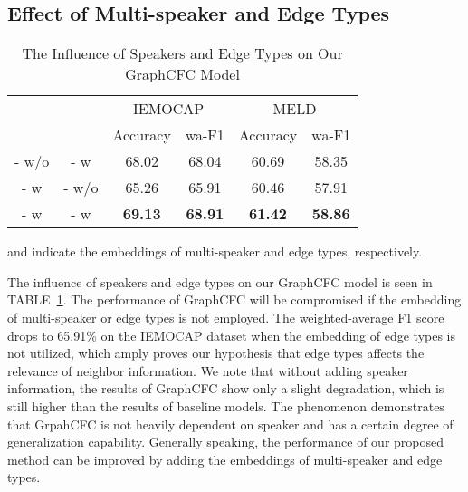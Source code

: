 \documentclass[lettersize,journal]{IEEEtran}
\begin{document}
\subsection{Effect of Multi-speaker and Edge Types}
\begin{table}[htbp]
\centering
\renewcommand{\arraystretch}{1.0}
\setlength{\tabcolsep}{7pt}
\caption{The Influence of Speakers and Edge Types on Our GraphCFC Model}
\begin{threeparttable}
\begin{tabular}{c|c|cc||cc}
\hline
\multicolumn{1}{c|}{\multirow{2}[0]{*}{}}& \multicolumn{1}{c|}{\multirow{2}[0]{*}{}} & \multicolumn{2}{c||}{IEMOCAP} & \multicolumn{2}{c}{MELD} \\
\cline{3-6}
& & Accuracy & wa-F1 & Accuracy & wa-F1 \\
\hline
- w/o   & - w & 68.02  & 68.04  & 60.69  & 58.35  \\
- w  & - w/o & 65.26  & 65.91  & 60.46  & 57.91  \\
\hline
- w   & - w &\textbf{69.13}  & \textbf{68.91}  & \textbf{61.42}  & \textbf{58.86}  \\
\hline
\end{tabular}\label{tab:speaker-edgetype} and  indicate the embeddings of multi-speaker and edge types, respectively.
\end{threeparttable}
\end{table}The influence of speakers and edge types on our GraphCFC model is seen in TABLE~\ref{tab:speaker-edgetype}. The performance of GraphCFC will be compromised if the embedding of multi-speaker or edge types is not employed. The weighted-average F1 score drops to 65.91\% on the IEMOCAP dataset when the embedding of edge types is not utilized, which amply proves our hypothesis that edge types affects the relevance of neighbor information. We note that without adding speaker information, the results of GraphCFC show only a slight degradation, which is still higher than the results of baseline models. The phenomenon demonstrates that GrpahCFC is not heavily dependent on speaker and has a certain degree of generalization capability. Generally speaking, the performance of our proposed method can be improved by adding the embeddings of multi-speaker and edge types.
\end{document}
